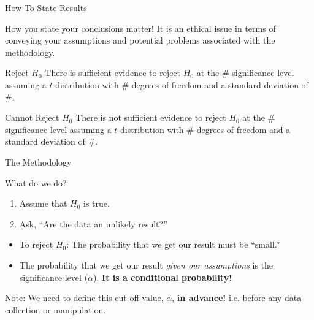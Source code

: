 \begin{frame}{How To State Results}

  How you state your conclusions matter! It is an ethical issue in
  terms of conveying your assumptions and potential problems
  associated with the methodology.

  \begin{block}{Reject $H_0$}
    There is sufficient evidence to reject $H_0$ at the \#
    significance level assuming a $t$-distribution with \# degrees of
    freedom and a standard deviation of \#.
  \end{block}

  \begin{block}{Cannot Reject $H_0$}
    There is not sufficient evidence to reject $H_0$ at the \#
    significance level assuming a $t$-distribution with \# degrees of
    freedom and a standard deviation of \#.
  \end{block}

  
\end{frame}

\begin{frame}{The Methodology}

  What do we do?

  \begin{enumerate}
  \item Assume that $H_0$ is true.
  \item Ask, ``Are the data an unlikely result?''
  \end{enumerate}

  {
    \begin{itemize}
    \item To reject $H_0$: The probability that we get our result must be ``small.''
    \item The probability that we get our result \textit{given our
        assumptions} is the significance level
      ($\alpha$). \textbf{\color{red} It is a conditional
        probability!}
    \end{itemize}
  }

  {
    Note: We need to define this cut-off value, $\alpha$, \textbf{in
      advance!} i.e. before any data collection or manipulation.
  }
  
\end{frame}



